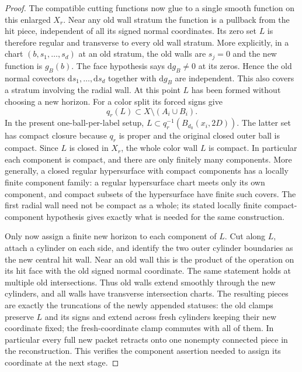\documentclass[11pt]{article}
\numberwithin{equation}{section}
\theoremstyle{definition}
\theoremstyle{remark}
\begin{document}
\begin{proof}
The compatible cutting functions now glue to a single smooth function
on this enlarged $X_r$.  Near any old wall stratum the function is a
pullback from the hit piece, independent of all its signed normal
coordinates.  Its zero set $L$ is therefore regular and transverse
to every old wall stratum.  More explicitly, in a chart
$(b,s_1,\ldots,s_d)$ at an old stratum, the old walls are $s_j=0$
and the new function is $g_B(b)$.  The face hypothesis says
$\mathrm d g_B\ne0$ at its zeros.  Hence the old normal covectors
$\mathrm d s_1,\ldots,\mathrm d s_d$ together with $\mathrm d g_B$ are independent.
This also covers a stratum involving the radial wall.  At this point
$L$ has been formed without choosing a new horizon.  For a color split its forced signs give
\[
 q_r(L)\subset X\setminus(A_i\cup B_i).
\]
In the present one-ball-per-label setup,
$L\subset q_r^{-1}(B_{d_0}(x_i,2D))$.  The latter set has compact
closure because $q_r$ is proper and the original closed outer ball
is compact.  Since $L$ is closed in $X_r$, the whole color wall $L$
is compact.  In particular each component is compact, and there are
only finitely many components.  More generally, a closed regular
hypersurface with compact components has a locally finite component
family: a regular hypersurface chart meets only its own component,
and compact subsets of the hypersurface have finite such covers.
The first radial wall need not be compact as a whole; its stated
locally finite compact-component hypothesis gives exactly what is
needed for the same construction.

Only now assign a finite new horizon to each component of $L$.
Cut along $L$, attach a cylinder on each side, and identify the two
outer cylinder boundaries as the new central hit wall.  Near an old
wall this is the product of the operation on its hit face with the
old signed normal coordinate.  The same statement holds at multiple
old intersections.  Thus old walls extend smoothly through the new
cylinders, and all walls have transverse intersection charts.
The resulting pieces are exactly the truncations of the newly
appended statuses: the old clamps preserve $L$ and its signs and
extend across fresh cylinders keeping their new coordinate fixed;
the fresh-coordinate clamp commutes with all of them.  In particular
every full new packet retracts onto one nonempty connected piece
in the reconstruction.  This verifies the component assertion
needed to assign its coordinate at the next stage.


\end{proof}
\end{document}

